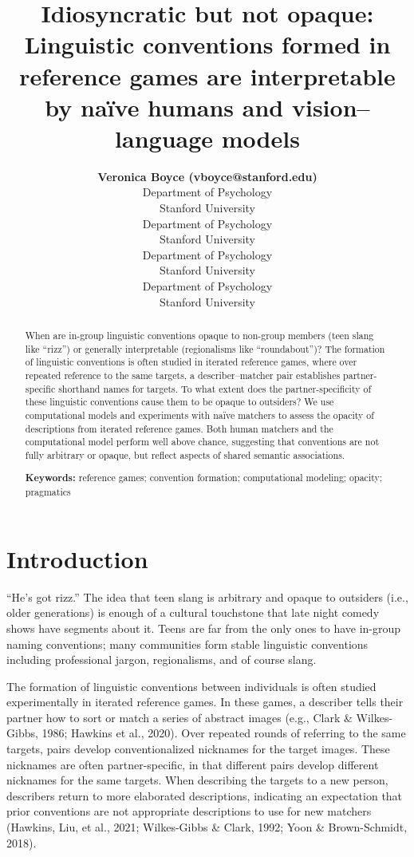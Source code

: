 \documentclass[10pt, letterpaper]{article}
\title{Idiosyncratic but not opaque: Linguistic conventions formed in
reference games are interpretable by naïve humans and vision--language
models}
\author{{\large \bf Veronica Boyce (vboyce@stanford.edu)} \\ Department of Psychology \\ Stanford University \And {\large \bf Ben Prystawski (benpry@stanford.edu)} \\Department of Psychology \\ Stanford University \AND {\large \bf Alvin Wei Ming Tan (tanawm@stanford.edu)} \\ Department of Psychology \\ Stanford University \And {\large \bf Michael C. Frank (mcfrank@stanford.edu)} \\ Department of Psychology \\ Stanford University}
\begin{document}
\maketitle

\begin{abstract}
When are in-group linguistic conventions opaque to non-group members
(teen slang like ``rizz'') or generally interpretable (regionalisms like
``roundabout'')? The formation of linguistic conventions is often
studied in iterated reference games, where over repeated reference to
the same targets, a describer--matcher pair establishes partner-specific
shorthand names for targets. To what extent does the partner-specificity
of these linguistic conventions cause them to be opaque to outsiders? We
use computational models and experiments with naïve matchers to assess
the opacity of descriptions from iterated reference games. Both human
matchers and the computational model perform well above chance,
suggesting that conventions are not fully arbitrary or opaque, but
reflect aspects of shared semantic associations.

\textbf{Keywords:}
reference games; convention formation; computational modeling; opacity;
pragmatics
\end{abstract}

\section{Introduction}\label{introduction}

``He's got rizz.'' The idea that teen slang is arbitrary and opaque to
outsiders (i.e., older generations) is enough of a cultural touchstone
that late night comedy shows have segments about it. Teens are far from
the only ones to have in-group naming conventions; many communities form
stable linguistic conventions including professional jargon,
regionalisms, and of course slang.

The formation of linguistic conventions between individuals is often
studied experimentally in iterated reference games. In these games, a
describer tells their partner how to sort or match a series of abstract
images (e.g., Clark \& Wilkes-Gibbs, 1986; Hawkins et al., 2020). Over
repeated rounds of referring to the same targets, pairs develop
conventionalized nicknames for the target images. These nicknames are
often partner-specific, in that different pairs develop different
nicknames for the same targets. When describing the targets to a new
person, describers return to more elaborated descriptions, indicating an
expectation that prior conventions are not appropriate descriptions to
use for new matchers (Hawkins, Liu, et al., 2021; Wilkes-Gibbs \& Clark,
1992; Yoon \& Brown-Schmidt, 2018).
\end{document}
